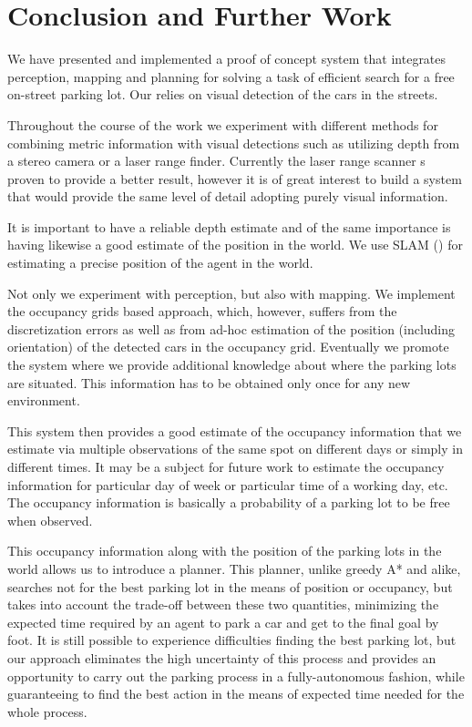 
\chapter{Conclusion and Further Work} %
\label{cha:conclusion_and_further_work}

    We have presented and implemented a proof of concept system that
    integrates perception, mapping and planning for solving a task of
    efficient search for a free on-street parking lot. Our relies on visual
    detection of the cars in the streets.

    Throughout the course of the work we experiment with different methods for
    combining metric information with visual detections such as utilizing
    depth from a stereo camera or a laser range finder. Currently the laser
    range scanner s proven to provide a better result, however it is of great
    interest to build a system that would provide the same level of detail
    adopting purely visual information.

    It is important to have a reliable depth estimate and of the same
    importance is having likewise a good estimate of the position in the
    world. We use SLAM
    (\cite{stachniss11isrr,kuemmerle11auro,kretzschmar10ki}) for estimating a
    precise position of the agent in the world.

    Not only we experiment with perception, but also with mapping. We
    implement the occupancy grids based approach, which, however, suffers from
    the discretization errors as well as from ad-hoc estimation of the
    position (including orientation) of the detected cars in the occupancy
    grid. Eventually we promote the system where we provide additional
    knowledge about where the parking lots are situated. This information has
    to be obtained only once for any new environment.

    This system then provides a good estimate of the occupancy information
    that we estimate via multiple observations of the same spot on different
    days or simply in different times. It may be a subject for future work to
    estimate the occupancy information for particular day of week or
    particular time of a working day, etc. The occupancy information is
    basically a probability of a parking lot to be free when observed.

    This occupancy information along with the position of the parking lots in
    the world allows us to introduce a planner. This planner, unlike greedy A*
    and alike, searches not for the best parking lot in the means of position
    or occupancy, but takes into account the trade-off between these two
    quantities, minimizing the expected time required by an agent to park a
    car and get to the final goal by foot. It is still possible to experience
    difficulties finding the best parking lot, but our approach eliminates the
    high uncertainty of this process and provides an opportunity to carry out
    the parking process in a fully-autonomous fashion, while guaranteeing to
    find the best action in the means of expected time needed for the whole
    process.


